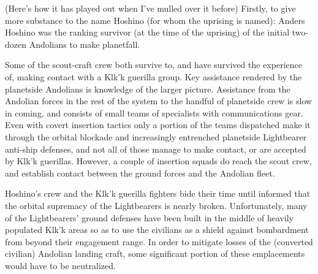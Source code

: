 \begin{itemize}
(Here's how it has played out when I've mulled over it before)
Firstly, to give more substance to the name Hoshino (for whom the
uprising is named): Anders Hoshino was the ranking survivor (at the
time of the uprising) of the initial two-dozen Andolians to make
planetfall.

Some of the scout-craft crew both survive to, and have survived the
experience of, making contact with a Klk'k guerilla group. Key
assistance rendered by the planetside Andolians is knowledge of the
larger picture. Assistance from the Andolian forces in the rest of the
system to the handful of planetside crew is slow in coming, and
consists of small teams of specialists with communications gear. Even
with covert insertion tactics only a portion of the teams dispatched
make it through the orbital blockade and increasingly entrenched
planetside Lightbearer anti-ship defenses, and not all of those manage
to make contact, or are accepted by Klk'k guerillas. However, a
couple of insertion squads do reach the scout crew, and establish
contact between the ground forces and the Andolian fleet.

Hoshino's crew and the Klk'k guerilla fighters bide their time until
informed that the orbital supremacy of the Lightbearers is nearly
broken. Unfortunately, many of the Lightbearers' ground defenses have
been built in the middle of heavily populated Klk'k areas so as to
use the civilians as a shield against bombardment from beyond their
engagement range. In order to mitigate losses of the (converted
civilian) Andolian landing craft, some significant portion of these
emplacements would have to be neutralized.


\end{itemize}
